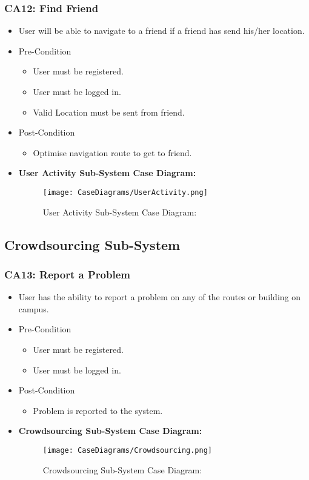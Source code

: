 \documentclass[12pt,a4paper]{article}
\begin{document}
		\subsubsection{CA12: Find Friend}
			\begin{itemize}
				\item User will be able to navigate to a friend if a friend has send his/her location.
				\item Pre-Condition
					\begin{itemize}
						\item User must be registered.
						\item User must be logged in.
						\item Valid Location must be sent from friend.
					\end{itemize}
				\item Post-Condition
					\begin{itemize}
						\item Optimise navigation route to get to friend.
					\end{itemize}
				\item \textbf{User Activity Sub-System Case Diagram:}
				\begin{figure}[H]
					\texttt{[image: CaseDiagrams/UserActivity.png]}
					\caption{User Activity Sub-System Case Diagram:}
				\end{figure}
			\end{itemize}
	\subsection{Crowdsourcing Sub-System}
		\subsubsection{CA13: Report a Problem}
			\begin{itemize}
				\item User has the ability to report a problem on any of the routes or building on campus.
				\item Pre-Condition
					\begin{itemize}
						\item User must be registered.
						\item User must be logged in.
					\end{itemize}
				\item Post-Condition
					\begin{itemize}
						\item Problem is reported to the system.
					\end{itemize}
				\item \textbf{Crowdsourcing Sub-System Case Diagram:}
				\begin{figure}[H]
					\texttt{[image: CaseDiagrams/Crowdsourcing.png]}
					\caption{Crowdsourcing Sub-System Case Diagram:}
				\end{figure}
			\end{itemize}
\end{document}
